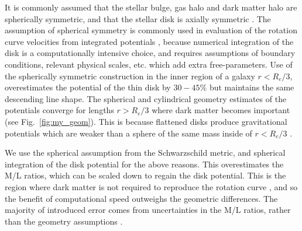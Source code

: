 \documentclass[reprint,%
 amsmath,amssymb,
 aps,
]{revtex4-1}
\begin{document}
 
  
    It is commonly assumed that   the stellar bulge, gas halo and   dark matter halo are spherically symmetric, and that the stellar disk is axially symmetric \cite{1954AJ.....59..273S}. 
    The assumption of spherical symmetry is commonly used   in evaluation of the   rotation curve velocities from integrated potentials \cite{2022A&A...664A..40M,PhysRevD.70.083509}, because numerical integration of the disk is a computationally intensive choice, and requires assumptions of  boundary conditions,   relevant physical scales,  etc. which add extra free-parameters\cite{2011A&A...531A..36H}.
Use of the spherically symmetric construction in the inner region of a galaxy $r< R_e/3$,  overestimates the potential of the thin disk by $30-45\%$ but maintains the same descending line shape.  The spherical and cylindrical geometry  estimates of the potentials converge for lengths $r>R_e/3$ where dark matter becomes important (see Fig.~\ref{fig:my_geom}).   This is   because flattened disks produce gravitational potentials which are weaker than a sphere of the same mass inside of $r< R_e/3$ \cite{Chatterjee}. 


We use the spherical assumption from the 
 Schwarzschild metric, and spherical integration of the disk potential for the above reasons.   This overestimates  the  M/L ratios,   which can be scaled down to regain the disk potential.   This is the region where dark matter is not required to reproduce the rotation curve \cite{1985ApJAlbada}, and so the benefit of computational speed outweighs the geometric differences.  
 The majority of introduced  error comes from uncertainties in the M/L ratios, rather than the geometry assumptions \cite{2016Lelli}. 
 
\end{document}

